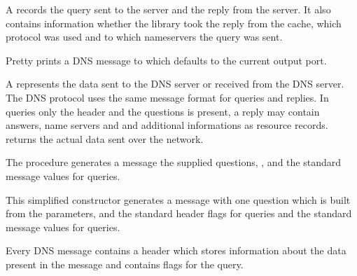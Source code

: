 \begin{desc}
  A  records the query sent to the server and the
  reply from the server. It also contains information whether the
  library took the reply from the cache, which protocol was used and
  to which nameservers the query was sent.
\end{desc}

\begin{desc}
  Pretty prints a DNS message to  which defaults to the
  current output port.
\end{desc}

\begin{desc}
  A  represents the data sent to the DNS server or
  received from the DNS server. The DNS protocol uses the same message
  format for queries and replies. In queries only the header and the
  questions is present, a reply may contain answers, name servers and
  and additional informations as resource records. 
  returns the actual data sent over the network.
\end{desc}

\begin{desc}
  The procedure generates a message the supplied questions,
  , and the standard message values for queries.
\end{desc}
\begin{desc}
  This simplified constructor generates a message with one question
  which is built from the parameters, and the standard header flags
  for queries and the standard message values for queries.
\end{desc}

\begin{desc}
  Every DNS message contains a header which stores information about
  the data present in the message and contains flags for the query.
\end{desc}

